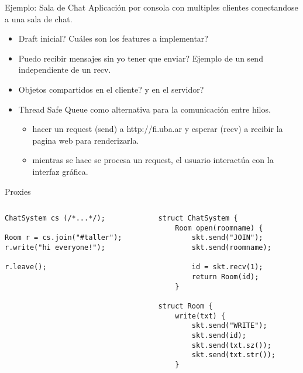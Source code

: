 \begin{frame}[fragile]{Ejemplo: Sala de Chat}{}
   Aplicaci\'on por consola con multiples clientes conectandose a una sala de chat.
   \begin{itemize}
      \item Draft inicial? Cu\'ales son los features a implementar?
          \pause
      \item Puedo recibir mensajes sin yo tener que enviar? Ejemplo de un send independiente de un recv.
          \pause
      \item Objetos compartidos en el cliente? y en el servidor?
          \pause
      \item Thread Safe Queue como alternativa para la comunicaci\'on entre hilos.
       \begin{itemize}
           \item hacer un request (send) a http://fi.uba.ar y esperar (recv) a recibir la pagina web para renderizarla.
           \item mientras se hace se procesa un request, el usuario interact\'ua con la interfaz gr\'afica.
       \end{itemize}
   \end{itemize}
\end{frame}

\begin{frame}[fragile]{Proxies}
   \begin{columns}[t]
      \begin{column}{.4\linewidth}
         \begin{lstlisting}[style=normal,firstnumber=1]
ChatSystem cs (/*...*/);

Room r = cs.join("#taller");
r.write("hi everyone!");

r.leave();
         \end{lstlisting}
      \end{column}
\pause
      \begin{column}{.4\linewidth}
         \begin{lstlisting}[style=normal,firstnumber=1]
struct ChatSystem {
    Room open(roomname) {
        skt.send("JOIN");
        skt.send(roomname);

        id = skt.recv(1);
        return Room(id);
    }

struct Room {
    write(txt) {
        skt.send("WRITE");
        skt.send(id);
        skt.send(txt.sz());
        skt.send(txt.str());
    }
         \end{lstlisting}
      \end{column}
   \end{columns}
\end{frame}





